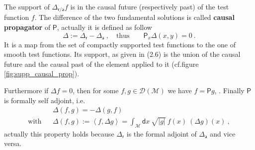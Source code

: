 \documentclass[11pt]{book}
\newcommand{\abs}[1]{\left|#1\right|}
\newcommand{\sm}[1]{\left\langle#1\right\rangle}
\newcommand{\Dcal}{\mathcal{D}}
\newcommand{\Mcal}{\mathcal{M}}
\newcommand{\Psf}{\mathsf{P}}
\newcommand{\asf}{\mathsf{a}}
\newcommand{\dsf}{\mathsf{d}}
\newcommand{\rsf}{\mathsf{r}}
\theoremstyle{break}
\begin{document}
The support of $\Delta_{\mathsf{\rsf/\asf}} f$ is in the causal future (respectively past) of the test function $f$. The difference of the two fundamental solutions is called \textbf{causal propagator} of $\Psf$, actually it is defined as follow
%
\begin{equation*}
\Delta := \Delta_\rsf - \Delta_\asf \ , \quad \mbox{thus} \qquad \Psf_x \Delta(x,y) = 0 \ .
\end{equation*}
%
It is a map from the  set of compactly supported  test functions to the one of smooth test functions. Its support, as given in (2.6) is the union of the causal future and the causal past of the element applied to it (cf.figure \ref{fig:supp_causal_prop}). 


Furthermore if $\Delta f = 0$, then for some $f, g\in\Dcal(\Mcal)$ we have $f = \Psf g$, . Finally $\Psf$ is formally self adjoint, i.e. 
%
\begin{eqnarray}
&&\Delta(f,g) = - \Delta(g,f) \\
%
\mbox{with} && \Delta(f,g) := \sm{f,\Delta g} = \int_\Mcal \dsf x \ \sqrt{\abs{g}} \ f(x) \ \left(\Delta g\right)(x) \ , \nonumber
\label{eq:smearing}
\end{eqnarray}
%
actually this property holds because $\Delta_\rsf$ is the formal adjoint of $\Delta_\asf$ and vice versa.


\bigskip
\end{document}
